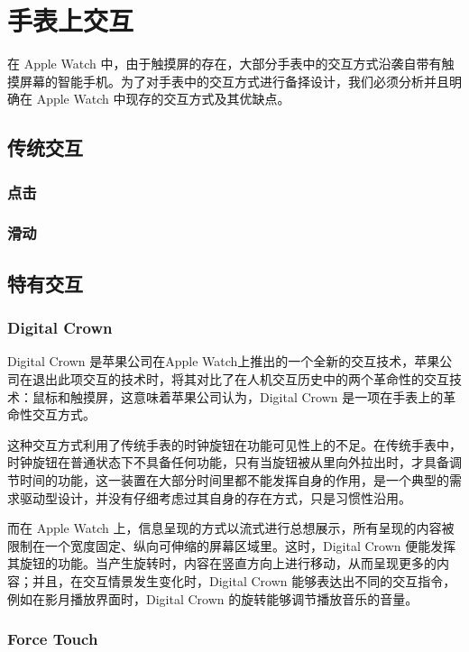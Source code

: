 \chapter{手表上交互}

\quad\quad 在 Apple Watch 中，由于触摸屏的存在，大部分手表中的交互方式沿袭自带有触摸屏幕的智能手机。为了对手表中的交互方式进行备择设计，我们必须分析并且明确在 Apple Watch 中现存的交互方式及其优缺点。

\section{传统交互}

\subsection{点击}

\subsection{滑动}

\section{特有交互}

\subsection{Digital Crown}

Digital Crown 是苹果公司在Apple Watch上推出的一个全新的交互技术，苹果公司在退出此项交互的技术时，将其对比了在人机交互历史中的两个革命性的交互技术：鼠标和触摸屏，这意味着苹果公司认为，Digital Crown 是一项在手表上的革命性交互方式。

这种交互方式利用了传统手表的时钟旋钮在功能可见性上的不足。在传统手表中，时钟旋钮在普通状态下不具备任何功能，只有当旋钮被从里向外拉出时，才具备调节时间的功能，这一装置在大部分时间里都不能发挥自身的作用，是一个典型的需求驱动型设计，并没有仔细考虑过其自身的存在方式，只是习惯性沿用。

而在 Apple Watch 上，信息呈现的方式以流式进行总想展示，所有呈现的内容被限制在一个宽度固定、纵向可伸缩的屏幕区域里。这时，Digital Crown 便能发挥其旋钮的功能。当产生旋转时，内容在竖直方向上进行移动，从而呈现更多的内容；并且，在交互情景发生变化时，Digital Crown 能够表达出不同的交互指令，例如在影月播放界面时，Digital Crown 的旋转能够调节播放音乐的音量。

\subsection{Force Touch}

